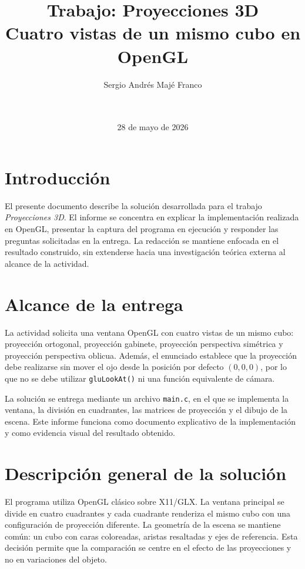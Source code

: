 \documentclass[12pt,a4paper]{article}
\title{\textbf{Trabajo: Proyecciones 3D}\\Cuatro vistas de un mismo cubo en OpenGL}
\author{Sergio Andrés Majé Franco}
\date{\Asignatura \\ \Universidad \\ 28 de mayo de 2026}
\begin{document}
\maketitle
\tableofcontents
\newpage

\section{Introducción}

El presente documento describe la solución desarrollada para el trabajo \textit{Proyecciones 3D}. El informe se concentra en explicar la implementación realizada en OpenGL, presentar la captura del programa en ejecución y responder las preguntas solicitadas en la entrega. La redacción se mantiene enfocada en el resultado construido, sin extenderse hacia una investigación teórica externa al alcance de la actividad.

\section{Alcance de la entrega}

La actividad solicita una ventana OpenGL con cuatro vistas de un mismo cubo: proyección ortogonal, proyección gabinete, proyección perspectiva simétrica y proyección perspectiva oblicua. Además, el enunciado establece que la proyección debe realizarse sin mover el ojo desde la posición por defecto $(0,0,0)$, por lo que no se debe utilizar \texttt{gluLookAt()} ni una función equivalente de cámara.

La solución se entrega mediante un archivo \texttt{main.c}, en el que se implementa la ventana, la división en cuadrantes, las matrices de proyección y el dibujo de la escena. Este informe funciona como documento explicativo de la implementación y como evidencia visual del resultado obtenido.

\section{Descripción general de la solución}

El programa utiliza OpenGL clásico sobre X11/GLX. La ventana principal se divide en cuatro cuadrantes y cada cuadrante renderiza el mismo cubo con una configuración de proyección diferente. La geometría de la escena se mantiene común: un cubo con caras coloreadas, aristas resaltadas y ejes de referencia. Esta decisión permite que la comparación se centre en el efecto de las proyecciones y no en variaciones del objeto.
\end{document}
